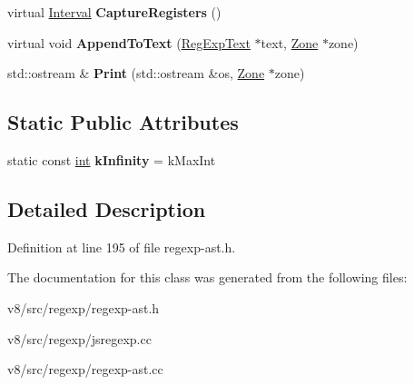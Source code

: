 \begin{DoxyCompactItemize}
\mbox{\label{classv8_1_1internal_1_1RegExpTree_ac9eaff84346b534c7617bfaf99fe277f}} 
virtual \mbox{\hyperlink{classv8_1_1internal_1_1Interval}{Interval}} {\bfseries Capture\+Registers} ()
\item 
\mbox{\label{classv8_1_1internal_1_1RegExpTree_a703a7d343de906a8a76dadc11907d6cc}} 
virtual void {\bfseries Append\+To\+Text} (\mbox{\hyperlink{classv8_1_1internal_1_1RegExpText}{Reg\+Exp\+Text}} $\ast$text, \mbox{\hyperlink{classv8_1_1internal_1_1Zone}{Zone}} $\ast$zone)
\item 
\mbox{\label{classv8_1_1internal_1_1RegExpTree_af682087bc39041e46f30cc97b6536605}} 
std\+::ostream \& {\bfseries Print} (std\+::ostream \&os, \mbox{\hyperlink{classv8_1_1internal_1_1Zone}{Zone}} $\ast$zone)
\end{DoxyCompactItemize}
\subsection*{Static Public Attributes}
\begin{DoxyCompactItemize}
\item 
\mbox{\label{classv8_1_1internal_1_1RegExpTree_a91c43a4c99efe5ac1ec0db20eff0a1f3}} 
static const \mbox{\hyperlink{classint}{int}} {\bfseries k\+Infinity} = k\+Max\+Int
\end{DoxyCompactItemize}


\subsection{Detailed Description}


Definition at line 195 of file regexp-\/ast.\+h.



The documentation for this class was generated from the following files\+:\begin{DoxyCompactItemize}
\item 
v8/src/regexp/regexp-\/ast.\+h\item 
v8/src/regexp/jsregexp.\+cc\item 
v8/src/regexp/regexp-\/ast.\+cc\end{DoxyCompactItemize}

